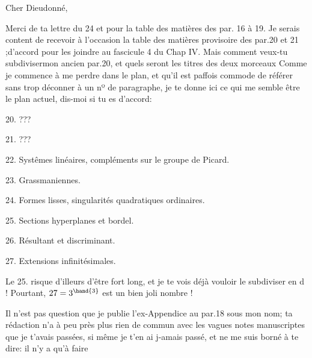 

Cher Dieudonné,

Merci de ta lettre du 24  et pour la table des matières des par.
16 à 19.  Je serais content de recevoir à l'occasion la table des
matières provisoire des par.20 et 21 ;d'accord pour les joindre au
fascicule 4 du Chap IV. Mais comment veux-tu  subdivisermon ancien par.20, et
quels seront les titres des deux morceaux  Comme je commence à me
perdre dans le plan, et qu'il est paffois commode de  référer
sans trop déconner à un nº de paragraphe, je te donne ici ce qui me
semble être le plan actuel, dis-moi si tu es d'accord:

20.  ???

21.  ???

22.  Systêmes linéaires, compléments sur le groupe de Picard.

23.  Grassmaniennes.

24.  Formes lisses, singularités quadratiques ordinaires.

25.  Sections hyperplanes et bordel.

26.  Résultant et discriminant.

27.  Extensions infinitésimales.

Le 25.  risque d'illeurs d'être fort long, et je te vois déjà
vouloir le subdiviser en d !  Pourtant, $27=3^{\hand{3}}$ est un bien joli
nombre !

Il n'est pas question que je publie l'ex-Appendice au par.18
sous mon nom; ta rédaction n'a à peu près plus rien de commun avec
les vagues notes manuscriptes que je t'avais passées, si même je t'en
ai j-amais passé, et ne me suis borné à te dire: il n'y a qu'à faire

